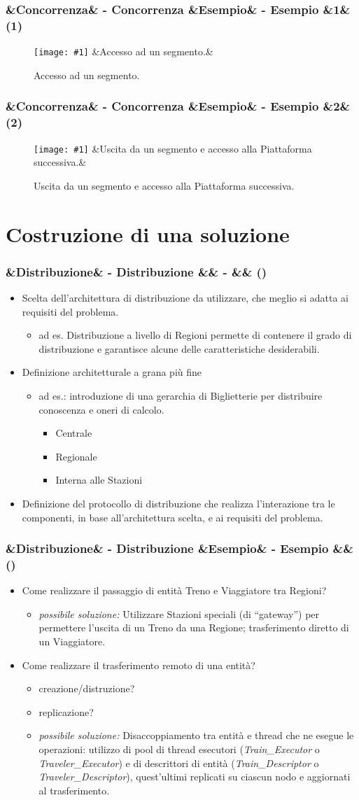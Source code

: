 \documentclass[slidestop,compress,blackandwhite]{beamer}
\newcommand{\ii}[1]{\textit{#1}}
\newcommand{\cm}[1]{\vspace{#1cm}}
\newcommand{\newtitle}[4]{
	#1 
	\ifx&#2&%
	\else
  		\large- #2
	\fi
	\ifx&#3&%
	\else
  		\small- #3
	\fi
	\ifx&#4&%
	\else
  		\normalsize (#4)
	\fi
}
\newcommand{\newframe}[5]{
	\begin{frame}
		\frametitle{\newtitle{#1}{#2}{#3}{#4}}
		#5
	\end{frame}
}
\newcommand{\myitemize}[1]{
	\begin{itemize}\itemsep4pt
	#1
	\end{itemize}
}
\newcommand{\newfigure}[3]{
	\begin{figure}
		\centering
		\texttt{[image: \#1]}
		\ifx&#3&%
		\else
	  		\caption{\scriptsize #3}
		\fi
	\end{figure}
}
\begin{document}
	\newframe{}{Concorrenza}{Esempio}{1}{
		\newfigure{imgs/ingresso_segmento}{0.5}{Accesso ad un segmento.}
	}
	
	\newframe{}{Concorrenza}{Esempio}{2}{
		\newfigure{imgs/ingresso_stazione}{0.5}{Uscita da un segmento e accesso alla Piattaforma successiva.}
	}
	
	
	
\section{Costruzione di una soluzione}\label{sol}

	\newframe{}{Distribuzione}{}{} {
		\myitemize {
			\item Scelta dell'architettura di distribuzione da utilizzare, che meglio si adatta ai requisiti del problema.
				\myitemize {
					\item ad es. Distribuzione a livello di Regioni permette di contenere il grado di distribuzione e garantisce alcune delle caratteristiche desiderabili.
				}
			
			\item Definizione architetturale a grana più fine
				\myitemize {
					\item ad es.: introduzione di una gerarchia di Biglietterie per distribuire conoscenza e oneri di calcolo.
						\myitemize {
							\item Centrale
							\item Regionale
							\item Interna alle Stazioni
						}
				}
			\item Definizione del protocollo di distribuzione che realizza l'interazione tra le componenti, in base all'architettura scelta, e ai requisiti del problema.
		}
	}

	\newframe{}{Distribuzione}{Esempio}{} {
		\myitemize {
			\item Come realizzare il passaggio di entità Treno e Viaggiatore tra Regioni?
				\myitemize {
					\item \ii{possibile soluzione:} Utilizzare Stazioni speciali (di ``gateway'') per permettere l'uscita di un Treno da una Regione; trasferimento diretto di un Viaggiatore.
				}
			\item Come realizzare il trasferimento remoto di una entità?
				\myitemize {
					\item creazione/distruzione?
					\item replicazione?
					\item \ii{possibile soluzione:} Disaccoppiamento tra entità e thread che ne esegue le operazioni: utilizzo di pool di thread esecutori (\ii{Train\_Executor} o \ii{Traveler\_Executor}) e di descrittori di entità (\ii{Train\_Descriptor} o \ii{Traveler\_Descriptor}), quest'ultimi replicati su ciascun nodo e aggiornati al trasferimento.
				}
		}
	}
	
\end{document}
